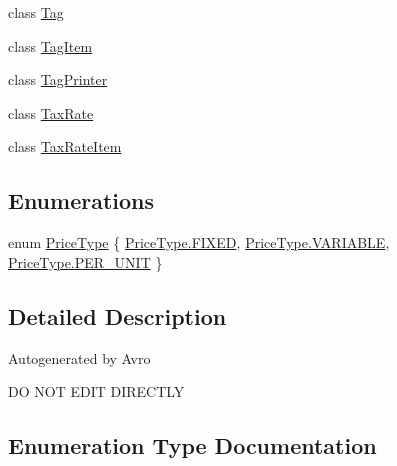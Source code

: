 \begin{DoxyCompactItemize}
class \hyperlink{classcom_1_1clover_1_1sdk_1_1v3_1_1inventory_1_1_tag}{Tag}
\item 
class \hyperlink{classcom_1_1clover_1_1sdk_1_1v3_1_1inventory_1_1_tag_item}{Tag\+Item}
\item 
class \hyperlink{classcom_1_1clover_1_1sdk_1_1v3_1_1inventory_1_1_tag_printer}{Tag\+Printer}
\item 
class \hyperlink{classcom_1_1clover_1_1sdk_1_1v3_1_1inventory_1_1_tax_rate}{Tax\+Rate}
\item 
class \hyperlink{classcom_1_1clover_1_1sdk_1_1v3_1_1inventory_1_1_tax_rate_item}{Tax\+Rate\+Item}
\end{DoxyCompactItemize}
\subsection*{Enumerations}
\begin{DoxyCompactItemize}
\item 
enum \hyperlink{namespacecom_1_1clover_1_1sdk_1_1v3_1_1inventory_a29563083c5ea6797e6ce5b3f5a1d2f12}{Price\+Type} \{ \hyperlink{namespacecom_1_1clover_1_1sdk_1_1v3_1_1inventory_a29563083c5ea6797e6ce5b3f5a1d2f12ac6e6dc18b53b4c2681394b9d8aefcec7}{Price\+Type.\+F\+I\+X\+ED}, 
\hyperlink{namespacecom_1_1clover_1_1sdk_1_1v3_1_1inventory_a29563083c5ea6797e6ce5b3f5a1d2f12ae61ad9b2553a293b4a3f4d3b4fa5ab31}{Price\+Type.\+V\+A\+R\+I\+A\+B\+LE}, 
\hyperlink{namespacecom_1_1clover_1_1sdk_1_1v3_1_1inventory_a29563083c5ea6797e6ce5b3f5a1d2f12a5673b4c47edd82feb2f6152696e7b005}{Price\+Type.\+P\+E\+R\+\_\+\+U\+N\+IT}
 \}
\end{DoxyCompactItemize}


\subsection{Detailed Description}
Autogenerated by Avro

DO N\+OT E\+D\+IT D\+I\+R\+E\+C\+T\+LY 

\subsection{Enumeration Type Documentation}
\mbox{\label{namespacecom_1_1clover_1_1sdk_1_1v3_1_1inventory_a29563083c5ea6797e6ce5b3f5a1d2f12}} 
